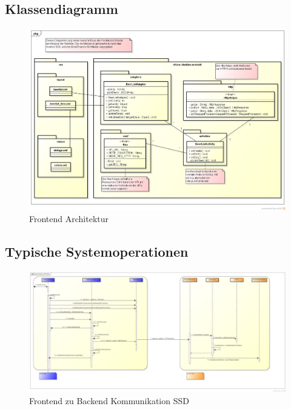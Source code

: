 \documentclass[10pt,a4paper]{scrartcl}
\begin{document}
\subsection{Klassendiagramm}
\begin{figure}[H]
	\includegraphics[height=0.9\textwidth,angle=90]{FrontendArchitektur.png}
	\caption{Frontend Architektur}
	\label{fig:frontend_architecture}
\end{figure}

\subsection{Typische Systemoperationen}
\begin{figure}[H]
	\includegraphics[height=0.75\textwidth,angle=90]{BeerlistSSD.png}
	\caption{Frontend zu Backend Kommunikation SSD}
	\label{fig:beerlist_ssd}
\end{figure}
\end{document}
